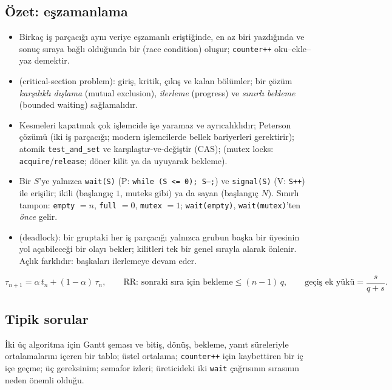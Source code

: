 \subsection*{Özet: eşzamanlama}
\begin{itemize}
  \item Birkaç iş parçacığı aynı veriye eşzamanlı eriştiğinde, en az biri yazdığında ve sonuç sıraya bağlı olduğunda bir  (race condition) oluşur; \texttt{counter++} oku--ekle--yaz demektir.
  \item {} (critical-section problem): giriş, kritik, çıkış ve kalan bölümler; bir çözüm \emph{karşılıklı dışlama} (mutual exclusion), \emph{ilerleme} (progress) ve \emph{sınırlı bekleme} (bounded waiting) sağlamalıdır.
  \item Kesmeleri kapatmak çok işlemcide işe yaramaz ve ayrıcalıklıdır; Peterson çözümü (iki iş parçacığı; modern işlemcilerde bellek bariyerleri gerektirir); atomik \texttt{test\_and\_set} ve karşılaştır-ve-değiştir (CAS);  (mutex locks: \texttt{acquire}/\texttt{release}; döner kilit ya da uyuyarak bekleme).
  \item Bir  $S$'ye yalnızca \texttt{wait(S)} (P: \texttt{while (S <= 0); S--;}) ve \texttt{signal(S)} (V: \texttt{S++}) ile erişilir; ikili (başlangıç $1$, muteks gibi) ya da sayan (başlangıç $N$). Sınırlı tampon: \texttt{empty} $= n$, \texttt{full} $= 0$, \texttt{mutex} $= 1$; \texttt{wait(empty)}, \texttt{wait(mutex)}'ten \emph{önce} gelir.
  \item {} (deadlock): bir gruptaki her iş parçacığı yalnızca grubun başka bir üyesinin yol açabileceği bir olayı bekler; kilitleri tek bir genel sırayla alarak önlenir. Açlık farklıdır: başkaları ilerlemeye devam eder.
\end{itemize}

\begin{keyidea}
\[
\tau_{n+1} = \alpha\, t_n + (1-\alpha)\, \tau_n, \qquad
\text{RR: sonraki sıra için bekleme} \le (n-1)\,q, \qquad
\text{geçiş ek yükü} = \frac{s}{q+s}.
\]
\end{keyidea}

\subsection*{Tipik sorular}
İki üç algoritma için Gantt şeması ve bitiş, dönüş, bekleme, yanıt süreleriyle ortalamalarını içeren bir tablo; üstel ortalama; \texttt{counter++} için kaybettiren bir iç içe geçme; üç gereksinim; semafor izleri; üreticideki iki \texttt{wait} çağrısının sırasının neden önemli olduğu.

